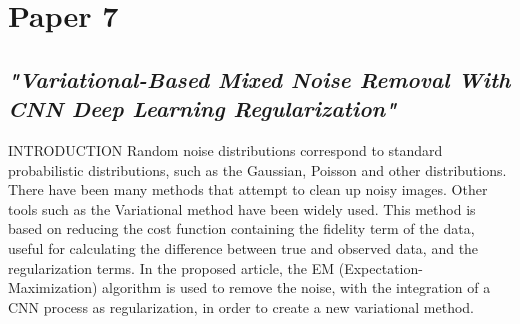\section{Paper 7}
\subsection{\emph{"Variational-Based Mixed Noise Removal With CNN Deep Learning Regularization"}}

\begin{frame}{INTRODUCTION}
    Random noise distributions correspond to standard probabilistic distributions, 
    such as the Gaussian, Poisson and other distributions. There have 
    been many methods that attempt to clean up noisy images. Other tools such as the Variational method have been widely used. 
    This method is based on reducing the cost function containing the fidelity 
    term of the data, useful for calculating the difference between true and observed 
    data, and the regularization terms. In the 
    proposed article, the EM (Expectation-Maximization) algorithm is used to 
    remove the noise, with the integration of a CNN process as regularization, 
    in order to create a new variational method.
\end{frame}

